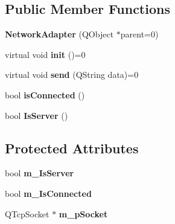 \subsection*{Public Member Functions}
\begin{DoxyCompactItemize}
\item 
\hypertarget{class_network_adapter_a06f7164599740e840ef4663558019319}{{\bfseries Network\-Adapter} (Q\-Object $\ast$parent=0)}\label{class_network_adapter_a06f7164599740e840ef4663558019319}

\item 
\hypertarget{class_network_adapter_a5bfaa6d0344e0026418c99a27548a332}{virtual void {\bfseries init} ()=0}\label{class_network_adapter_a5bfaa6d0344e0026418c99a27548a332}

\item 
\hypertarget{class_network_adapter_a304921c7d4e599031608a9a9217c900f}{virtual void {\bfseries send} (Q\-String data)=0}\label{class_network_adapter_a304921c7d4e599031608a9a9217c900f}

\item 
\hypertarget{class_network_adapter_a955b0bf900e7eca5051c203f86898538}{bool {\bfseries is\-Connected} ()}\label{class_network_adapter_a955b0bf900e7eca5051c203f86898538}

\item 
\hypertarget{class_network_adapter_a37549ba9c99061a8c5407299b380139d}{bool {\bfseries Is\-Server} ()}\label{class_network_adapter_a37549ba9c99061a8c5407299b380139d}

\end{DoxyCompactItemize}
\subsection*{Protected Attributes}
\begin{DoxyCompactItemize}
\item 
\hypertarget{class_network_adapter_a8517d41d27fad01cd65a6342b562f7e0}{bool {\bfseries m\-\_\-\-Is\-Server}}\label{class_network_adapter_a8517d41d27fad01cd65a6342b562f7e0}

\item 
\hypertarget{class_network_adapter_aac7a55e1d924965afcb829f9c9f3da15}{bool {\bfseries m\-\_\-\-Is\-Connected}}\label{class_network_adapter_aac7a55e1d924965afcb829f9c9f3da15}

\item 
\hypertarget{class_network_adapter_a805305b01405a2890d9bbb784d44bde1}{Q\-Tcp\-Socket $\ast$ {\bfseries m\-\_\-p\-Socket}}\label{class_network_adapter_a805305b01405a2890d9bbb784d44bde1}

\end{DoxyCompactItemize}


